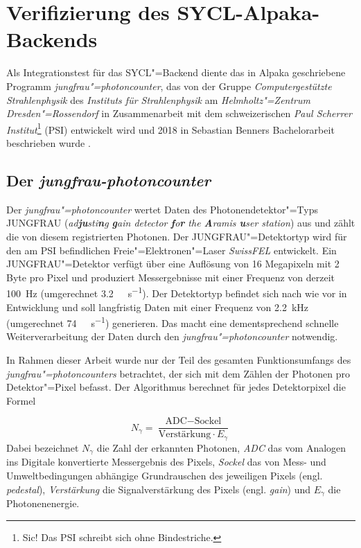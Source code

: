 \section{Verifizierung des SYCL-Alpaka-Backends}
\label{ergebnisse:verifizierung}

Als Integrationstest für das SYCL"=Backend diente das in Alpaka geschriebene
Programm \textit{jungfrau"=photoncounter}, das von der Gruppe
\textit{Computergestützte Strahlenphysik} des \textit{Instituts für
Strahlenphysik} am \textit{Helmholtz"=Zentrum Dresden"=Rossendorf} in
Zusammenarbeit mit dem schweizerischen
\textit{Paul Scherrer Institut}\footnote{Sic! Das PSI schreibt sich ohne
Bindestriche.} (PSI) entwickelt wird und 2018 in Sebastian Benners
Bachelorarbeit beschrieben wurde \cite[vgl.][]{benner2018}.

\subsection{Der \textit{jungfrau-photoncounter}}
\label{ergebnisse:verifizierung:jungfrau}

Der \textit{jungfrau"=photoncounter} wertet Daten des Photonendetektor"=Typs
JUNGFRAU (\textit{ad\textbf{ju}sti\textbf{n}g \textbf{g}ain detector
\textbf{f}o\textbf{r} the \textbf{A}ramis \textbf{u}ser station}) aus und zählt
die von diesem registrierten Photonen. Der JUNGFRAU"=Detektortyp wird für den am
PSI befindlichen Freie"=Elektronen"=Laser \textit{SwissFEL} entwickelt. Ein
JUNGFRAU"=Detektor verfügt über eine Auflösung von 16 Megapixeln mit 2 Byte pro
Pixel und produziert Messergebnisse mit einer Frequenz von derzeit
\SI{100}{\hertz} (umgerechnet \SI{3.2}{\giga\byte\per\second}). Der Detektortyp
befindet sich nach wie vor in Entwicklung und soll langfristig Daten mit einer
Frequenz von \SI{2.2}{\kilo\hertz} (umgerechnet \SI{74}{\giga\byte\per\second})
generieren. Das macht eine dementsprechend schnelle Weiterverarbeitung der Daten
durch den \textit{jungfrau"=photoncounter} notwendig.

In Rahmen dieser Arbeit wurde nur der Teil des gesamten Funktionsumfangs des
\textit{jungfrau"=photoncounters} betrachtet, der sich mit dem Zählen der
Photonen pro Detektor"=Pixel befasst. Der Algorithmus berechnet für jedes
Detektorpixel die Formel

\begin{equation}\label{ergebnisse:verifizierung:jungfrau:formel}
    N_\gamma = \frac{\text{ADC} - \text{Sockel}}{\text{Verstärkung} \cdot E_\gamma}
\end{equation}
\noindent
Dabei bezeichnet $N_\gamma$ die Zahl der erkannten Photonen, \textit{ADC} das
vom Analogen ins Digitale konvertierte Messergebnis des Pixels, \textit{Sockel}
das von Mess- und Umweltbedingungen abhängige Grundrauschen des jeweiligen
Pixels (engl. \textit{pedestal}), \textit{Verstärkung} die Signalverstärkung
des Pixels (engl. \textit{gain}) und $E_\gamma$ die Photonenenergie.

